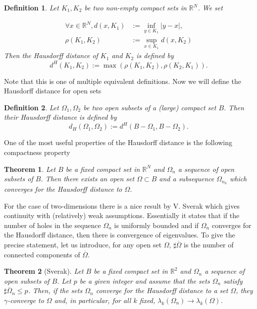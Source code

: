 \documentclass[12pt]{report}
\newtheorem{theorem}{Theorem}[section]
\newtheorem{definition}{Definition}
\numberwithin{definition}{section}
\begin{document}
\begin{definition}
  Let $K_{1},K_{2}$ be two non-empty compact sets in $\mathbb{R}^{N}$.
  We set 

  \begin{align*}
    \forall x \in \mathbb{R}^{N}, d(x,K_{1}) &:= \inf_{y\in K_{1}} | y - x |, \\
    \rho(K_{1},K_{2}) &:= \sup_{x\in K_{1}} d(x,K_{2})
  \end{align*}
  Then the Hausdorff distance of $K_{1}$ and $K_{2}$ is defined by 
  \[
  d^{H}(K_{1},K_{2}) := \max (\rho(K_{1},K_{2}),\rho(K_{2},K_{1}))
  .\] 
\end{definition}

Note that this is one of multiple equivalent definitions.
Now we will define the Hausdorff distance for open sets
\begin{definition}
  Let $\Omega_{1},\Omega_{2}$ be two open subsets of a (large) compact set $B$.
  Then their Hausdorff distance is defined by 
  \[
  d_{H}(\Omega_{1},\Omega_{2}) := d^{H}(B- \Omega_{1}, B - \Omega_{2})
  .\] 
\end{definition}

One of the most useful properties of the Hausdorff distance is the following compactness property\cite{convergence}
\begin{theorem}
  Let $B$ be a fixed compact set in $\mathbb{R}^{N}$ and $\Omega_{n}$ a sequence of open subsets of $B$.
  Then there exists an open set $\Omega \subset B$ and a subsequence $\Omega_{n_{k}}$ which converges for the Hausdorff distance to $\Omega$.
\end{theorem}

For the case of two-dimensions there is a nice result by V. Sverak which gives continuity with (relatively) weak assumptions\cite{sverak}.
Essentially it states that if the number of holes in the sequence $\Omega_{n}$ is uniformly bounded and if $\Omega_{n}$ converges for the Hausdorff distance, then there is convergence of eigenvalues.
To give the precise statement, let us introduce, for any open set $\Omega$, $\sharp \overline{\Omega}$ is the number of connected components of $\overline{\Omega}$.

\begin{theorem}[Sverak] \label{sverak}
  Let $B$ be a fixed compact set in $\mathbb{R}^{2}$ and $\Omega_{n}$ a sequence of open subsets of $B$.
  Let $p$ be a given integer and assume that the sets $\Omega_{n}$ satisfy $\sharp \overline{\Omega}_{n} \leq p$.
  Then, if the sets $\Omega_{n}$ converge for the Hausdorff distance to a set $\Omega$, they $\gamma$-converge to $\Omega$ and, in particular, for all $k$ fixed, $\lambda_{k}(\Omega_{n}) \to \lambda_{k}(\Omega)$.
\end{theorem}
\end{document}

